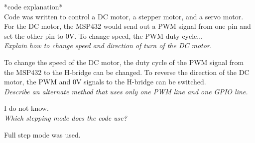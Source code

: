 \documentclass[CMPE]{KGCOEReport}
\begin{document}
*code explanation*\\
Code was written to control a DC motor, a stepper motor, and a servo motor. For the DC motor, the MSP432 would send out a PWM signal from one pin and set the other pin to 0V. To change speed, the PWM duty cycle... \\

\emph{Explain how to change speed and direction of turn of the DC motor.}

To change the speed of the DC motor, the duty cycle of the PWM signal from the MSP432 to the H-bridge can be changed. To reverse the direction of the DC motor, the PWM and 0V signals to the H-bridge can be switched.\\

\emph{Describe an alternate method that uses only one PWM line and one GPIO line.}

I do not know.\\

\emph{Which stepping mode does the code use?}

Full step mode was used.\\
\end{document}
